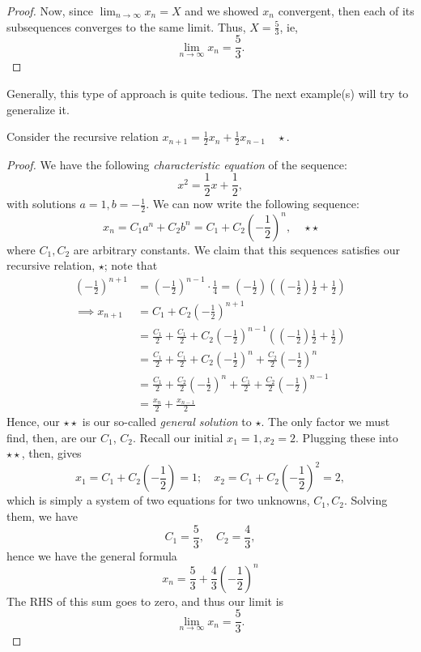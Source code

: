 \documentclass[12pt]{article}
\begin{document}
\begin{proof}
  Now, since $\lim_{n\to\infty} x_{n} = X$ and we showed $x_{n}$ convergent, then each of its subsequences converges to the same limit. Thus, $X = \frac{5}{3}$, ie, \[\lim_{n\to\infty} x_{n} = \frac{5}{3}.\]
\end{proof}
\begin{remark}
  Generally, this type of approach is quite tedious. The next example(s) will try to generalize it.
\end{remark}
\begin{example}
  Consider the recursive relation $x_{n+1} = \frac{1}{2} x_{n} + \frac{1}{2} x_{n-1}\quad \star$.
  \begin{proof}
    We have the following \textit{characteristic equation} of the sequence:\[x^2 = \frac{1}{2} x + \frac{1}{2},\] with solutions $a = 1, b = -\frac{1}{2}$. We can now write the following sequence: \[x_{n} = C_1 a^{n} + C_2 b^n = C_1 + C_2 (-\frac{1}{2})^n, \quad \star\star\] where $C_1, C_2$ are arbitrary constants. We claim that this sequences satisfies our recursive relation, $\star$; note that 
    \begin{align*}
      \left(-\frac{1}{2}\right)^{n+1} &= \left(-\frac{1}{2}\right)^{n-1} \cdot \frac{1}{4} = \left(-\frac{1}{2}\right)\left(\left(-\frac{1}{2}\right)\frac{1}{2} + \frac{1}{2}\right)\\
      \implies x_{n+1} &= C_1 + C_2\left(-\frac{1}{2}\right)^{n+1}\\
     &= \frac{C_1}{2} + \frac{C_1}{2} + C_2\left(-\frac{1}{2}\right)^{n-1}\left(\left(-\frac{1}{2}\right)\frac{1}{2} + \frac{1}{2}\right)\\
      &= \frac{C_1}{2} + \frac{C_1}{2}+C_2\left(-\frac{1}{2}\right)^{n} + \frac{C_2}{2}\left(-\frac{1}{2}\right)^{n}\\
      &= \frac{C_1}{2} + \frac{C_2}{2}\left(-\frac{1}{2}\right)^{n} + \frac{C_1}{2} + \frac{C_2}{2}\left(-\frac{1}{2}\right)^{n-1}\\
      &= \frac{x_n}{2} + \frac{x_{n-1}}{2}
    \end{align*}
    Hence, our $\star\star$ is our so-called \textit{general solution} to $\star$. The only factor we must find, then, are our $C_1$, $C_2$. Recall our initial $x_1 = 1, x_2 = 2$. Plugging these into $\star\star$, then, gives \[x_1 = C_1 + C_2\left(-\frac{1}{2}\right) = 1; \quad x_2 = C_1 + C_2 \left(-\frac{1}{2}\right)^2 = 2,\] which is simply a system of two equations for two unknowns, $C_1, C_2$. Solving them\footnotemark, we have \[C_1 = \frac{5}{3},\quad C_2 = \frac{4}{3},\] hence we have the general formula \[
      x_{n} = \frac{5}{3} + \frac{4}{3}\left(-\frac{1}{2}\right)^{n}  
    \]
    The RHS of this sum goes to zero, and thus our limit is \[\lim_{n\to\infty}x_n = \frac{5}{3}.\]
  \end{proof}
\end{example}
\end{document}
